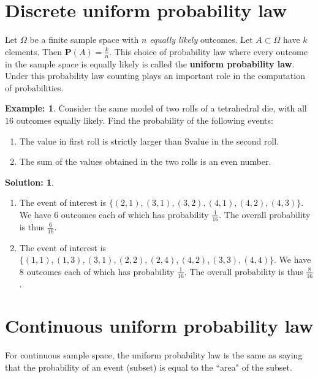 \documentclass[11pt]{amsart}
\theoremstyle{definition} \newtheorem{thm}{Theorem:} \theoremstyle{plain}
\theoremstyle{definition} \newtheorem*{nnthm}{Theorem:} \theoremstyle{plain}
\theoremstyle{definition} \newtheorem{lem}{Lemma} \theoremstyle{plain}
\theoremstyle{definition} \newtheorem*{nnlem}{Lemma:} \theoremstyle{plain}
\theoremstyle{definition} \newtheorem{prf}{Proof:} \theoremstyle{plain}
\theoremstyle{definition} \newtheorem*{nnprf}{Proof:} \theoremstyle{plain}
\theoremstyle{definition} \newtheorem{eg}{Example:} \theoremstyle{plain}
\theoremstyle{definition} \newtheorem*{sol}{Solution:} \theoremstyle{plain}
\newcommand{\prob}[1]{\mathbf{P}(#1)}
\begin{document}
\section{Discrete uniform probability law}
Let $\Omega$ be a finite sample space with $n$ \emph{equally likely} outcomes. 
Let $A \subset \Omega$ have $k$ elements. Then $\prob{A} = \frac{k}{n}$. This 
choice of probability law where every outcome in the sample space is equally 
likely is called the \textbf{uniform probability law}. Under this probability 
law counting plays an important role in the computation of probabilities.
 
\begin{eg}
Consider the same model of two rolls of a tetrahedral die, with all $16$ 
outcomes equally likely. Find the probability of the following events:
\begin{enumerate}
\item
The value in first roll is strictly larger than Svalue in the second roll.
\item
The sum of the values obtained in the two rolls is an even number.
\end{enumerate}
\end{eg}
\begin{sol}
\hfill
\begin{enumerate}
\item
The event of interest is $\{ (2, 1), (3, 1), (3, 2), (4, 1), (4, 2), (4, 3) \}$. 
We have $6$ outcomes each of which has probability $\frac{1}{16}$. The overall probability is thus $\frac{6}{16}$.
\item
The event of interest is $\{ (1, 1), (1, 3), (3, 1), (2, 2), (2, 4), (4, 2), 
(3, 3), (4, 4) \}$. We have $8$ outcomes each of which has probability 
$\frac{1}{16}$. The overall probability is thus $\frac{8}{16}$.
\end{enumerate}
\end{sol}


\section{Continuous uniform probability law}
For continuous sample space, the uniform probability law is the same as saying 
that the probability of an event (subset) is equal to the ``area" of the subset.
\end{document}
